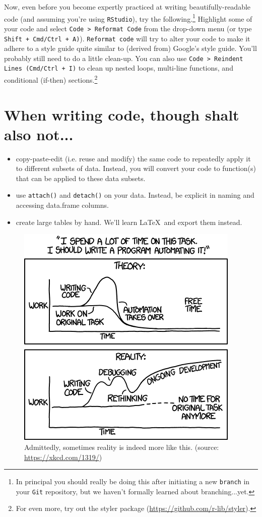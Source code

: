 \documentclass[12pt,letterpaper]{article}
\begin{document}
Now, even before you become expertly practiced at writing beautifully-readable code (and assuming you're using \texttt{RStudio}), try the following.\footnote{In principal you should really be doing this after initiating a new \texttt{branch} in your \texttt{Git} repository, but we haven't formally learned about branching...yet.}
Highlight some of your code and select \texttt{Code > Reformat Code} from the drop-down menu (or type \texttt{Shift + Cmd/Ctrl + A)}).
\texttt{Reformat code} will try to alter your code to make it adhere to a style guide quite similar to (derived from) Google's style guide.
You'll probably still need to do a little clean-up.
You can also use \texttt{Code > Reindent Lines (Cmd/Ctrl + I)} to clean up nested loops, multi-line functions, and conditional (if-then) sections.\footnote{For even more, try out the styler package (\url{https://github.com/r-lib/styler}).}





\section{When writing code, though shalt also not...}

\begin{itemize}
	\item copy-paste-edit (i.e. reuse and modify) the same code to repeatedly apply it to different subsets of data.  Instead, you will convert your code to function(s) that can be applied to these data subsets.
	\item use \texttt{attach()} and \texttt{detach()} on your data.  Instead, be explicit in naming and accessing data.frame columns.
	\item create large tables by hand. We'll learn \LaTeX\ and export them instead.
\end{itemize}

\begin{figure}
	\centering
	\includegraphics[width=0.7\linewidth]{figs/automation.png}
	\caption{Admittedly, sometimes reality is indeed more like this.  (source: \url{https://xkcd.com/1319/})}
	\label{fig:automation}
\end{figure}
\end{document}
